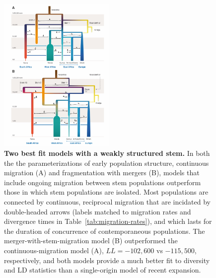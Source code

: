 \documentclass{article}
\begin{document}
\begin{figure}[t!]
    \centering
    \includegraphics[width=0.5\textwidth]{figures/fig2}
    \caption{
        \textbf{Two best fit models with a weakly structured stem.}
        In both the the parameterizations of early population structure,
        continuous migration (A) and fragmentation with mergers (B), models
        that include ongoing migration between stem populations outperform
        those in which stem populations are isolated. Most populations are
        connected by continuous, reciprocal migration that are incidated by 
        double-headed arrows (labels matched to migration rates and divergence
        times in Table~\ref{tab:migration-rates}), and which lasts for the
        duration of concurrence of contemporaneous populations. The
        merger-with-stem-migration model (B) outperformed the
        continuous-migration model (A), $LL=-102,600$ vs $-115,500$,
        respectively, and both models provide a much better fit to diversity
        and LD statistics than a single-origin model of recent expansion.
    }
    \label{fig:2}
\end{figure}
\end{document}
